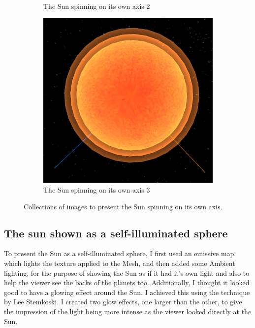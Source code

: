\documentclass[12pt]{article}
\begin{document}
\begin{figure}[H]
\begin{subfigure}[b]{0.4\textwidth}
                \caption{The Sun spinning on its own axis 2}
                \label{fig: The axial spin of the Sun.}
       \end{subfigure}
               \begin{subfigure}[b]{0.4\textwidth}
                \includegraphics[width=\textwidth]{images/sunaxialrotation3}
                \caption{The Sun spinning on its own axis 3}
                \label{fig: The axial spin of the Sun.}
       \end{subfigure}
       \caption{Collections of images to present the Sun spinning on its own axis.}\label{fig: The Sun's axial rotation.}
\end{figure}

\subsection{The sun shown as a self-illuminated sphere}
To present the Sun as a self-illuminated sphere, I first used an emissive map, which lights the texture applied to the Mesh, and then added some Ambient lighting, for the purpose of showing the Sun as if it had it's own light and also to help the viewer see the backs of the planets too. Additionally, I thought it looked good to have a glowing effect around the Sun. I achieved this using the technique by Lee Stemkoski\cite{sunglow}. I created two glow effects, one larger than the other, to give the impression of the light being more intense as the viewer looked directly at the Sun. 
\end{document}
